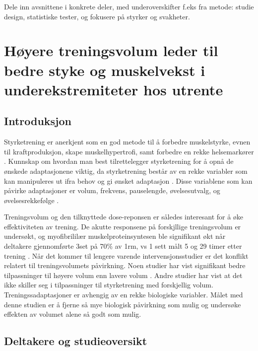 \documentclass[
]{book}
\begin{document}
Dele inn avsnittene i konkrete deler, med underoverskifter f.eks fra metode: studie design, statistiske tester, og fokusere på styrker og svakheter.

\hypertarget{huxf8yere-treningsvolum-leder-til-bedre-styke-og-muskelvekst-i-underekstremiteter-hos-utrente}{%
\chapter{Høyere treningsvolum leder til bedre styke og muskelvekst i underekstremiteter hos utrente}\label{huxf8yere-treningsvolum-leder-til-bedre-styke-og-muskelvekst-i-underekstremiteter-hos-utrente}}

\hypertarget{introduksjon-1}{%
\section{Introduksjon}\label{introduksjon-1}}

Styrketrening er anerkjent som en god metode til å forbedre muskelstyrke, evnen til kraftproduksjon, skape muskelhypertrofi, samt forbedre en rekke helsemarkører \citep{kraemer2002}. Kunnskap om hvordan man best tilrettelegger styrketrening for å opnå de ønskede adaptasjonene viktig, da styrketrening består av en rekke variabler som kan manipuleres ut ifra behov og gi ønsket adaptasjon \citep{kraemer2004, bird2005}. Disse variablene som kan påvirke adaptasjoner er volum, frekvens, pauselengde, øvelsesutvalg, og øvelsesrekkefølge \citep{American2009}.

Treningsvolum og den tilknyttede dose-reponsen er således interesant for å øke effektiviteten av trening. De akutte responsene på forskjllige treningsvolum er undersøkt, og myofibrililær muskelproteinsyntesen ble signifikant økt når deltakere gjennomførte 3set på 70\% av 1rm, vs 1 sett målt 5 og 29 timer etter trening \citep{burd2010}. Når det kommer til lengere varende intervensjonsstudier er det konflikt relatert til treningsvolumets påvirkning. Noen studier har vist signifikant bedre tilpassninger til høyere volum enn lavere volum \citep[ ]{rønnestad2007, starkey1996, radaelli2015}. Andre studier har vist at det ikke skiller seg i tilpassninger til styrketrening med forskjellig volum\citep{bottaro2011, galvao2005, mcbride2003}. Treningssadaptasjoner er avhengig av en rekke biologiske variabler. Målet med denne studien er å fjerne så mye biologisk påvirkning som mulig og undersøke effekten av volumet alene så godt som mulig.

\hypertarget{deltakere-og-studieoversikt}{%
\section{Deltakere og studieoversikt}\label{deltakere-og-studieoversikt}}
\end{document}
